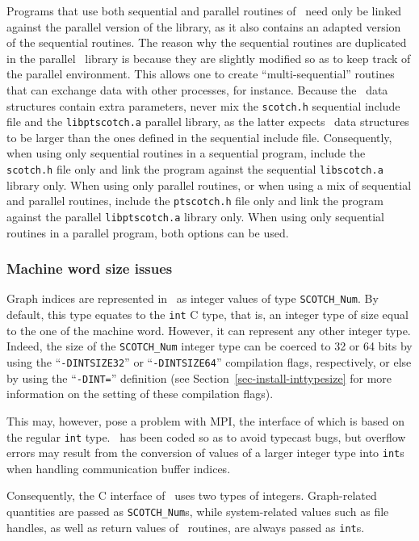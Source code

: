 Programs that use both sequential and parallel routines of
\scotch\ need only be linked against the parallel version of the
library, as it also contains an adapted version of the sequential
routines. The reason why the sequential routines are duplicated in the
parallel \ptscotch\ library is because they are slightly modified so
as to keep track of the parallel environment. This allows one to
create ``multi-sequential'' routines that can exchange data with other
processes, for instance. Because the \libscotch\ data structures
contain extra parameters, never mix the \texttt{scotch.h} sequential
include file and the \texttt{libptscotch.a} parallel library, as the
latter expects \scotch\ data structures to be larger than the ones
defined in the sequential include file. Consequently, when using only
sequential routines in a sequential program, include the
\texttt{scotch.h} file only and link the program against the sequential
\texttt{libscotch.a} library only. When using only parallel routines,
or when using a mix of sequential and parallel routines, include the
\texttt{ptscotch.h} file only and link the program against the parallel
\texttt{libptscotch.a} library only. When using only sequential
routines in a parallel program, both options can be used.

\subsubsection{Machine word size issues}
\label{sec-lib-inttypesize}

Graph indices are represented in \scotch\ as integer values of type
{\tt SCOTCH\_\lbt Num}. By default, this type equates to the {\tt int}
C type, that is, an integer type of size equal to the one of 
the machine word. However, it can represent any other integer
type. Indeed, the size of the {\tt SCOTCH\_\lbt Num} integer type can
be coerced to 32 or 64 bits by using the ``{\tt -DINTSIZE32}'' or
``{\tt -DINTSIZE64}'' compilation flags, respectively, or else by
using the ``{\tt -DINT=}'' definition (see
Section~\ref{sec-install-inttypesize} for more information on the
setting of these compilation flags).

This may, however, pose a problem with MPI, the interface of which is
based on the regular {\tt int} type. \ptscotch\ has been coded so
as to avoid typecast bugs, but overflow errors may result from the
conversion of values of a larger integer type into {\tt int}s when
handling communication buffer indices.

Consequently, the C interface of \scotch\ uses two types of integers.
Graph-related quantities are passed as {\tt SCOTCH\_\lbt Num}s,
while system-related values such as file handles, as well as
return values of \libscotch\ routines, are always passed as
{\tt int}s.

